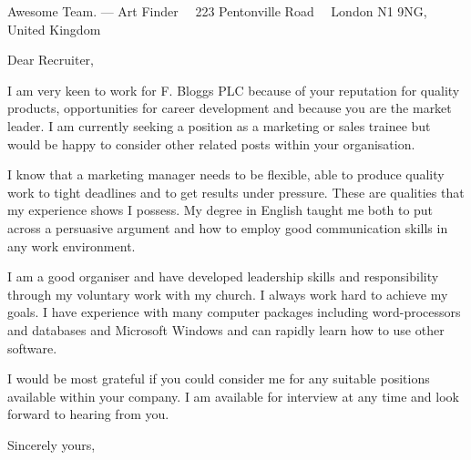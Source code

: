 \documentclass{scrlttr2}
\renewcommand{\\}{\ {\large\textperiodcentered}\ }
\begin{document}

\begin{letter}{ %
Awesome Team. --- Art Finder\\
223 Pentonville Road\\
London N1 9NG, United Kingdom
}


\opening{Dear Recruiter,}

I am very keen to work for F. Bloggs PLC because of your reputation for quality products, opportunities for career development and because you are the market leader. I am currently seeking a position as a marketing or sales trainee but would be happy to consider other related posts within your organisation.\\

I know that a marketing manager needs to be flexible, able to produce quality work to tight deadlines and to get results under pressure. These are qualities that my experience shows I possess. My degree in English taught me both to put across a persuasive argument and how to employ good communication skills in any work environment.\\

I am a good organiser and have developed leadership skills and responsibility through my voluntary work with my church. I always work hard to achieve my goals. I have experience with many computer packages including word-processors and databases and Microsoft Windows and can rapidly learn how to use other software.\\

I would be most grateful if you could consider me for any suitable positions available within your company. I am available for interview at any time and look forward to hearing from you.\\

Sincerely yours, \\ \\ \\


\end{letter}
\end{document}
